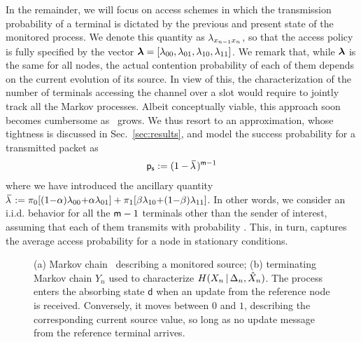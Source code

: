 In the remainder, we will focus on access schemes in which the transmission probability of a terminal is dictated by the previous and present state of the monitored process. We denote this quantity as $\lambda_{x_{n-1} x_n}$, so that the access policy is fully specified by the vector $\bm{\lambda} = [\lambda_{00},\lambda_{01},\lambda_{10},\lambda_{11}]$. We remark that, while $\bm{\lambda}$ is the same for all nodes, the actual contention probability of each of them depends on the current evolution of its source. In view of this, the characterization of the number of terminals accessing the channel over a slot would require to jointly track all the Markov processes. Albeit conceptually viable, this approach soon becomes cumbersome as \nodes\ grows. We thus resort to an approximation, whose tightness is discussed in Sec.~\ref*{sec:results}, and model the success probability for a transmitted packet as
\begin{align}
    \ps := (1-\avgPTx)^{\nodes-1}
    \label{eq:ps}
\end{align}
where we have introduced the ancillary quantity \mbox{$\avgPTx := \statZ [ (1{-}\qZO) \pTx_{00} {+} \qZO \pTx_{01} ] + \statO [\qOZ \pTx_{10} {+} (1{-}\qOZ) \pTx_{11}]$}.
In other words, we consider an i.i.d. behavior for all the $\mathsf m-1$ terminals other than the sender of interest, assuming that each of them transmits with probability \avgPTx. This, in turn, captures the average access probability for a node in stationary conditions. 


\begin{figure}    
    \hspace*{.1em}
    \caption{(a) Markov chain \Mcn\ describing a monitored source; (b) terminating Markov chain $Y_n$ used to characterize $H(X_n\, | \,\Delta_n,\hat{X}_n)$. The process enters the absorbing state $\mathsf d$ when an update from the reference node is received. Conversely, it moves between $0$ and $1$, describing the corresponding current source value, so long as no update message from the reference terminal arrives.}
    \label{fig:markovChains}
    \vspace{-1em}
\end{figure}

